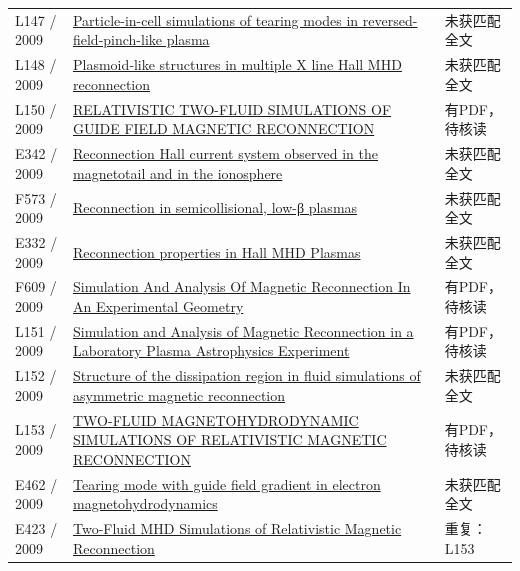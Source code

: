 \documentclass[UTF8,a4paper,11pt,openany,fontset=fandol]{ctexbook}
\begin{document}
\begin{longtable}{P{24mm}P{97mm}P{27mm}}
L147 / 2009 & \href{https://doi.org/10.1063/1.3079075}{Particle-in-cell simulations of tearing modes in reversed-field-pinch-like plasma} & 未获匹配全文\\

L148 / 2009 & \href{https://doi.org/10.1029/2009ja014257}{Plasmoid‐like structures in multiple X line Hall MHD reconnection} & 未获匹配全文\\

L150 / 2009 & \href{https://doi.org/10.1088/0004-637x/705/1/907}{RELATIVISTIC TWO-FLUID SIMULATIONS OF GUIDE FIELD MAGNETIC RECONNECTION} & 有PDF，待核读\\

E342 / 2009 & \href{https://doi.org/10.1029/2009gl037239}{Reconnection Hall current system observed in the magnetotail and in the ionosphere} & 未获匹配全文\\

F573 / 2009 & \href{https://doi.org/10.1063/1.3155453}{Reconnection in semicollisional,  low-β plasmas} & 未获匹配全文\\

E332 / 2009 & \href{http://absimage.aps.org/image/DPP09/MWS_DPP09-2009-000900.pdf}{Reconnection properties in Hall MHD Plasmas} & 未获匹配全文\\

F609 / 2009 & \href{https://doi.org/10.5281/zenodo.47876}{Simulation And Analysis Of Magnetic Reconnection In An Experimental Geometry} & 有PDF，待核读\\

L151 / 2009 & \href{https://doi.org/10.5281/zenodo.16803}{Simulation and Analysis of Magnetic Reconnection in a Laboratory Plasma Astrophysics Experiment} & 有PDF，待核读\\

L152 / 2009 & \href{https://doi.org/10.1063/1.3086867}{Structure of the dissipation region in fluid simulations of asymmetric magnetic reconnection} & 未获匹配全文\\

L153 / 2009 & \href{https://doi.org/10.1088/0004-637x/696/2/1385}{TWO-FLUID MAGNETOHYDRODYNAMIC SIMULATIONS OF RELATIVISTIC MAGNETIC RECONNECTION} & 有PDF，待核读\\

E462 / 2009 & \href{https://doi.org/10.1063/1.3078470}{Tearing mode with guide field gradient in electron magnetohydrodynamics} & 未获匹配全文\\

E423 / 2009 & \href{https://arxiv.org/abs/0902.2074v1}{Two-Fluid MHD Simulations of Relativistic Magnetic Reconnection} & 重复：L153\\


\end{longtable}
\end{document}
